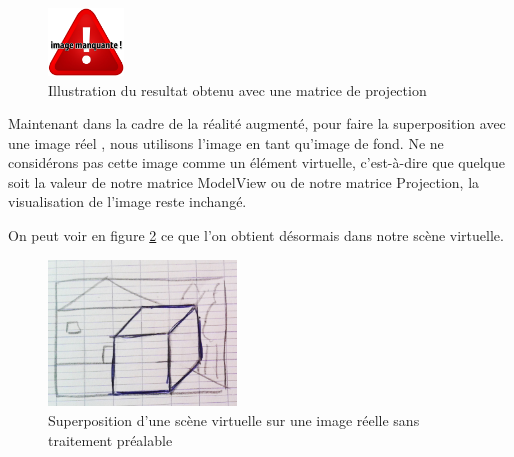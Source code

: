 \begin{figure}[!ht]
\centering
\includegraphics[width = 2cm] {images/nop.png}
\caption{Illustration du resultat obtenu avec une matrice de projection}
\label{fig:projection}
\end{figure}






Maintenant dans la cadre de la réalité augmenté, pour faire la superposition avec une image réel , nous utilisons l’image en tant qu’image de fond. Ne ne considérons pas cette image comme un élément virtuelle, c’est-à-dire que quelque soit la valeur de notre matrice ModelView ou de notre matrice Projection, la visualisation de l’image reste inchangé.

On peut voir en figure \ref{fig:schemaRV1} ce que l’on obtient désormais dans notre scène virtuelle.

\begin{figure}[!ht]
\centering
\includegraphics[width = 5cm] {images/croquisRAModelViewBefore.jpg}
\caption{Superposition d'une scène virtuelle sur une image réelle sans traitement préalable}
\label{fig:schemaRV1}
\end{figure}

